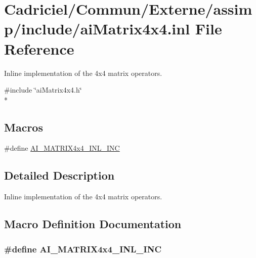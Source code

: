 \hypertarget{ai_matrix4x4_8inl}{\section{Cadriciel/\-Commun/\-Externe/assimp/include/ai\-Matrix4x4.inl File Reference}
\label{ai_matrix4x4_8inl}
}


Inline implementation of the 4x4 matrix operators.  


{\ttfamily \#include \char`\"{}ai\-Matrix4x4.\-h\char`\"{}}\\*
\subsection*{Macros}
\begin{DoxyCompactItemize}
\item 
\#define \hyperlink{ai_matrix4x4_8inl_aff41ff37c5b66dda7952689bc0a3504f}{A\-I\-\_\-\-M\-A\-T\-R\-I\-X4x4\-\_\-\-I\-N\-L\-\_\-\-I\-N\-C}
\end{DoxyCompactItemize}


\subsection{Detailed Description}
Inline implementation of the 4x4 matrix operators. 

\subsection{Macro Definition Documentation}
\hypertarget{ai_matrix4x4_8inl_aff41ff37c5b66dda7952689bc0a3504f}{
\subsubsection[{A\-I\-\_\-\-M\-A\-T\-R\-I\-X4x4\-\_\-\-I\-N\-L\-\_\-\-I\-N\-C}]{\setlength{\rightskip}{0pt plus 5cm}\#define A\-I\-\_\-\-M\-A\-T\-R\-I\-X4x4\-\_\-\-I\-N\-L\-\_\-\-I\-N\-C}}\label{ai_matrix4x4_8inl_aff41ff37c5b66dda7952689bc0a3504f}
